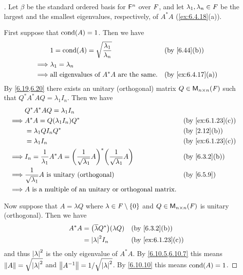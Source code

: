 \begin{proof}[]
  Let \(\beta\) be the standard ordered basis for \(\mathsf{F}^n\) over \(\mathit{F}\), and let \(\lambda_1, \lambda_n \in \mathit{F}\) be the largest and the smallest eigenvalues, respectively, of \(A^* A\) (\cref{ex:6.4.18}(a)).

  First suppose that \(\cond{A} = 1\).
  Then we have
  \begin{align*}
             & 1 = \cond{A} = \sqrt{\dfrac{\lambda_1}{\lambda_n}}     &  & \by{6.44}[b]      \\
    \implies & \lambda_1 = \lambda_n                                                         \\
    \implies & \text{all eigenvalues of } A^* A \text{ are the same}. &  & \by{ex:6.4.17}[a]
  \end{align*}
  By \cref{6.19,6.20} there exists an unitary (orthogonal) matrix \(Q \in \ms[n][n][\F]\) such that \(Q^* A^* A Q = \lambda_1 I_n\).
  Then we have
  \begin{align*}
             & Q^* A^* A Q = \lambda_1 I_n                                                                                                       \\
    \implies & A^* A = Q (\lambda_1 I_n) Q^*                                                                              &  & \by{ex:6.1.23}[c] \\
             & = \lambda_1 Q I_n Q^*                                                                                      &  & \by{2.12}[b]      \\
             & = \lambda_1 I_n                                                                                            &  & \by{ex:6.1.23}[c] \\
    \implies & I_n = \dfrac{1}{\lambda_1} A^* A = \pa{\dfrac{1}{\sqrt{\lambda_1}} A}^* \pa{\dfrac{1}{\sqrt{\lambda_1}} A} &  & \by{6.3.2}[b]     \\
    \implies & \dfrac{1}{\sqrt{\lambda_1}} A \text{ is unitary (orthogonal)}                                              &  & \by{6.5.9}        \\
    \implies & A \text{ is a multiple of an unitary or orthogonal matrix}.
  \end{align*}

  Now suppose that \(A = \lambda Q\) where \(\lambda \in \mathit{F} \setminus \left\lbrace0\right\rbrace\) and \(Q \in \ms[n][n][\F]\) is unitary (orthogonal).
  Then we have
  \begin{align*}
    A^* A & = \pa{\conj{\lambda} Q^*} (\lambda Q) &  & \by{6.3.2}[b]     \\
          & = \abs{\lambda}^2 I_n                 &  & \by{ex:6.1.23}[c]
  \end{align*}
  and thus \(\left\lvert\lambda\right\rvert^2\) is the only eigenvalue of \(A^* A\).
  By \cref{6.10.5,6.10.7} this means \(\left\lVert A\right\rVert = \sqrt{\left\lvert\lambda\right\rvert^2}\) and \(\left\lVert A^{-1}\right\rVert = 1 / \sqrt{\left\lvert\lambda\right\rvert^2}\).
  By \cref{6.10.10} this means \(\cond{A} = 1\).
\end{proof}


